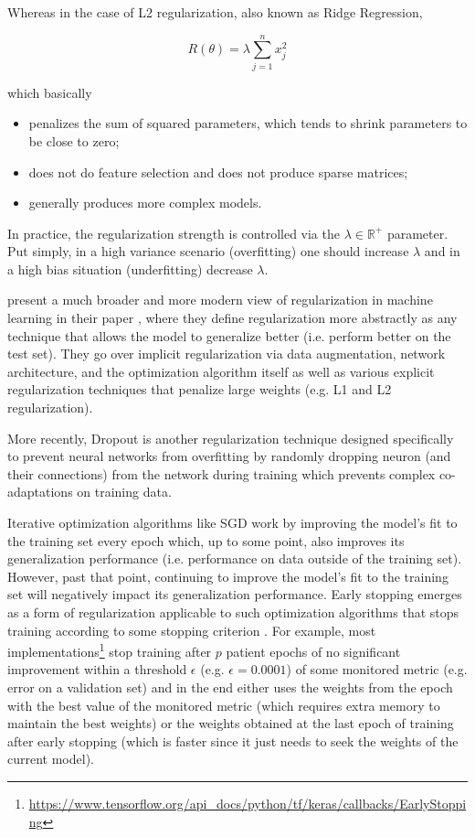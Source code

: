 Whereas in the case of L2 regularization, also known as Ridge Regression,

$$
R(\theta) = \lambda \sum_{j=1}^{n} x_j^2
$$

which basically

\begin{itemize}
    \item penalizes the sum of squared parameters, which tends to shrink parameters to be close to zero;
    \item does not do feature selection and does not produce sparse matrices;
    \item generally produces more complex models.
\end{itemize}

In practice, the regularization strength is controlled via the $\lambda \in \mathbb{{R}^{+}}$ parameter. Put simply, in a high variance scenario (overfitting) one should increase $\lambda$ and in a high bias situation (underfitting) decrease $\lambda$.

\citeauthor{regularizationsurvey} present a much broader and more modern view of regularization in machine learning in their \citeyear{regularizationsurvey} paper \cite{regularizationsurvey}, where they define regularization more abstractly as any technique that allows the model to generalize better (i.e. perform better on the test set). They go over implicit regularization via data augmentation, network architecture, and the optimization algorithm itself as well as various explicit regularization techniques that penalize large weights (e.g. L1 and L2 regularization).

More recently, Dropout \cite{dropout} is another regularization technique designed specifically to prevent neural networks from overfitting by randomly dropping neuron (and their connections) from the network during training which prevents complex co-adaptations on training data.

Iterative optimization algorithms like \ac{SGD} work by improving the model's fit to the training set every epoch which, up to some point, also improves its generalization performance (i.e. performance on data outside of the training set). However, past that point, continuing to improve the model's fit to the training set will negatively impact its generalization performance. Early stopping emerges as a form of regularization applicable to such optimization algorithms that stops training according to some stopping criterion \cite{earlystopping} \cite{deeplearning}. For example, most implementations\footnote{\url{https://www.tensorflow.org/api_docs/python/tf/keras/callbacks/EarlyStopping}} stop training after $p$ patient epochs of no significant improvement within a threshold $\epsilon$ (e.g. $\epsilon = 0.0001$) of some monitored metric (e.g. error on a validation set) and in the end either uses the weights from the epoch with the best value of the monitored metric (which requires extra memory to maintain the best weights) or the weights obtained at the last epoch of training after early stopping (which is faster since it just needs to seek the weights of the current model).

